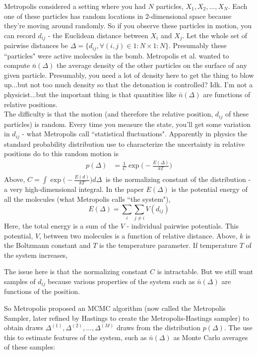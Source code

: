 \documentclass[twoside]{article}
\begin{document}
Metropolis considered a setting where you had $N$ particles, $X_1, X_2, \dots, X_N$. Each one of these particles has random locations in 2-dimensional space because they're moving around randomly. So if you observe these particles in motion, you can record $d_{ij}$ - the Euclidean distance between $X_i$ and $X_j$. Let the whole set of pairwise distances be  $\Delta = \{ d_{ij}, \forall (i,j) \in 1:N \times 1:N \}$. Presumably these ``particles" were active molecules in the bomb. Metropolis et al. wanted to compute $\bar n (\Delta) $ the average density of the other particles on the surface of any given particle. Presumably, you need a lot of density here to get the thing to blow up...but not too much density so that the detonation is controlled? Idk. I'm not a physicist...but the important thing is that quantities like $\bar n(\Delta)$ are functions of relative positions. \\

The difficulty is that the motion (and therefore the relative position, $d_{ij}$ of these particles) is random. Every time you measure the state, you'll get some variation in $d_{ij}$ - what Metropolis call ``statistical fluctuations". Apparently in physics the standard probability distribution use to characterize the uncertainty in relative positions do to this random motion is
\begin{equation}
	\begin{split}
	p( \Delta ) &= \frac{1}{C} \exp \Big(  - \frac{E(\Delta) }{kT} \Big) \\
	\end{split}
\end{equation}
Above, $C = \int \exp \Big(  - \frac{E(d) }{kT} \Big) d \Delta\ $ is the normalizing constant of the distribution - a very high-dimensional integral. In the paper $E(\Delta)$ is the potential energy of all the molecules (what Metropolis calls ``the system"), 
$$ E(\Delta) = \sum_i \sum_{j\neq i} V(d_{ij}) $$
Here, the total energy is a sum of the $V$ - individual pairwise potentials. This potential, $V$, between two molecules is a function of relative distance. Above, $k$ is the Boltzmann constant and $T$ is the temperature parameter. If temperature $T$ of the system increases,

The issue here is that the normalizing constant $C$ is intractable. But we still want samples of $d_{ij}$ because various properties of the system such as $\bar n (\Delta)$ are functions of the position.

So Metropolis proposed an MCMC algorithm (now called the Metropolis Sampler, later refined by Hastings to create the Metropolis-Hastings sampler) to obtain draws $\Delta^{(1)}, \Delta^{(2)}, \dots, \Delta^{(M)}$ draws from the distribution $p(\Delta)$. The use this to estimate features of the system, such as $\bar n(\Delta)$ as Monte Carlo averages of these samples:
\end{document}

